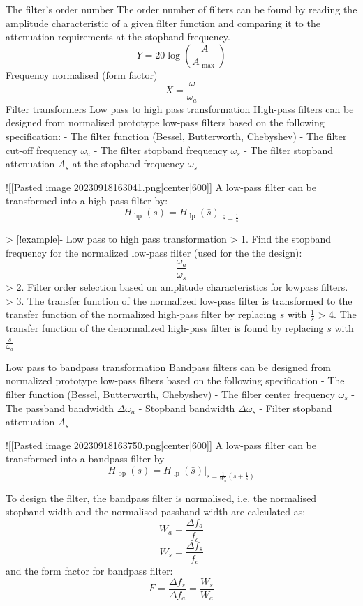 The filter's order number
The order number of filters can be found by reading the amplitude characteristic of a given filter function and comparing it to the attenuation requirements at the stopband frequency. 
$$Y=20\log\left( \frac{A}{A_{\text{ max }}} \right)$$
Frequency normalised (form factor)
$$X=\frac{\omega}{\omega_{a}}$$
Filter transformers
Low pass to high pass transformation
High-pass filters can be designed from normalised prototype low-pass filters based on the following specification:
- The filter function (Bessel, Butterworth, Chebyshev) 
- The filter cut-off frequency $\omega_{a}$
- The filter stopband frequency $\omega_{s}$
- The filter stopband attenuation $A_{s}$ at the stopband frequency $\omega_{s}$

![[Pasted image 20230918163041.png|center|600]]
A low-pass filter can be transformed into a high-pass filter by:
$$H_{\text{ hp }}(s)=H_{\text{ lp }}(\bar{s})|_{\bar{s}=\frac{1}{s}}$$


> [!example]- Low pass to high pass transformation
> 1. Find the stopband frequency for the normalized low-pass filter (used for the
the design):
$$\frac{\omega_{a}}{\omega_{s}}$$
> 2. Filter order selection based on amplitude characteristics for lowpass filters.
> 3. The transfer function of the normalized low-pass filter is transformed to the transfer function of the normalized high-pass filter by replacing $s$ with $\frac{1}{s}$
> 4. The transfer function of the denormalized high-pass filter is found by replacing $s$ with $\frac{s}{\omega_{a}}$


Low pass to bandpass transformation
Bandpass filters can be designed from normalized prototype low-pass filters based on the following specification
- The filter function (Bessel, Butterworth, Chebyshev) 
- The filter center frequency $\omega_{s}$
- The passband bandwidth $\Delta \omega _a$
- Stopband bandwidth $\Delta \omega _s$
- Filter stopband attenuation $A_{s}$

![[Pasted image 20230918163750.png|center|600]]
A low-pass filter can be transformed into a bandpass filter by
$$H_{\text{ bp }}(s)=H_{\text{ lp }}(\bar{s})|_{\bar{s}=\frac{1}{W_{a}}\left( s+\frac{1}{s} \right)}$$

To design the filter, the bandpass filter is normalised, i.e. the normalised stopband width and the normalised passband width are calculated as:
$$W_{a}=\frac{\Delta f_{a}}{f_{c}}$$
$$W_{s}=\frac{\Delta f_{s}}{f_{c}}$$
and the form factor for bandpass filter:
$$F=\frac{\Delta f_{s}}{\Delta f_{a}}=\frac{W_{s}}{W_{a}}$$


